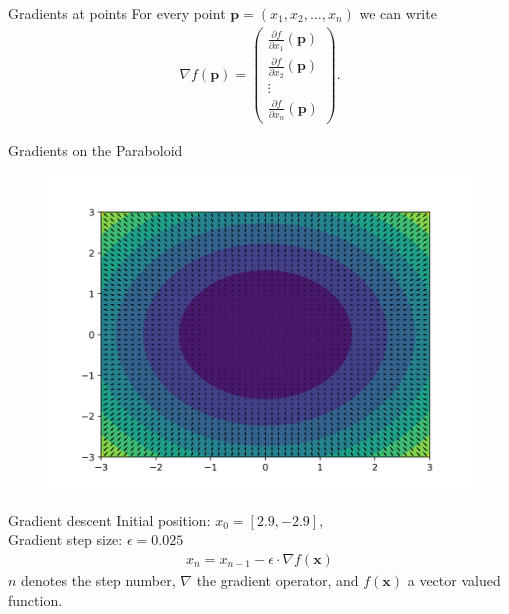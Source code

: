 \documentclass[notes]{beamer}
\begin{document}
    \begin{frame}{Gradients at points}
      For every point $\mathbf{p} = (x_1, x_2, \dots , x_n)$ we can write
      \begin{align}
        \nabla f (\mathbf{p}) = \begin{pmatrix}
          \frac{\partial f}{\partial x_1} (\mathbf{p}) \\
          \frac{\partial f}{\partial x_2} (\mathbf{p}) \\
          \vdots \\
          \frac{\partial f}{\partial x_n} (\mathbf{p}) 
        \end{pmatrix}.
      \end{align}
    \end{frame}


    \begin{frame}{Gradients on the Paraboloid}
      \begin{figure}
        \includegraphics[width=.9\linewidth]{./figures/quiver_paraboloid.png}
      \end{figure}
    \end{frame}

    \begin{frame}{Gradient descent}
      Initial position: $x_0 = [2.9, -2.9]$, \\
      Gradient step size: $\epsilon = 0.025 $
      \begin{align}
        x_n = x_{n-1} - \epsilon \cdot \nabla f(\mathbf{x})
      \end{align}
      $n$ denotes the step number, $\nabla$ the gradient operator, and $f(\mathbf{x})$ a vector valued function.
    \end{frame}
\end{document}
